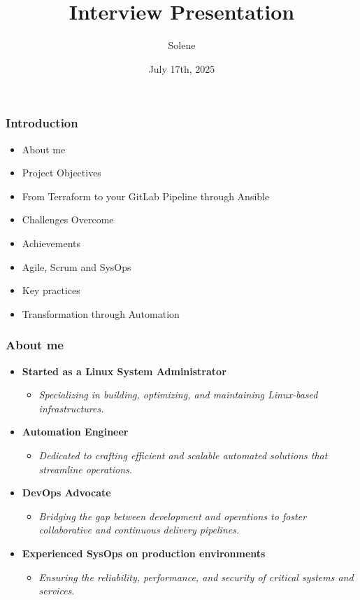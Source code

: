 \documentclass{beamer}
\title{Interview Presentation}
\author{Solene}
\date{July 17th, 2025}
\begin{document}
\frame{\titlepage}

\begin{frame}
\frametitle{Introduction}
\begin{itemize}
    \item About me
    \item Project Objectives
    \item From Terraform to your GitLab Pipeline through Ansible
    \item Challenges Overcome
    \item Achievements
    \item Agile, Scrum and SysOps
    \item Key practices
    \item Transformation through Automation
\end{itemize}
\end{frame}

\begin{frame}
\frametitle{About me}
\begin{itemize}
    \item \textbf{Started as a Linux System Administrator}  
    \begin{itemize}
        \item \textit{Specializing in building, optimizing, and maintaining Linux-based infrastructures.}
    \end{itemize}

    \item \textbf{Automation Engineer}  
    \begin{itemize}
        \item  \textit{Dedicated to crafting efficient and scalable automated solutions that streamline operations.}
    \end{itemize}

    \item \textbf{DevOps Advocate}  
    \begin{itemize}
       \item  \textit{Bridging the gap between development and operations to foster collaborative and continuous delivery pipelines.}
    \end{itemize}

    \item \textbf{Experienced SysOps on production environments}  
    \begin{itemize}
        \item \textit{Ensuring the reliability, performance, and security of critical systems and services}.  
    \end{itemize}
\end{itemize}
\end{frame}
\end{document}
